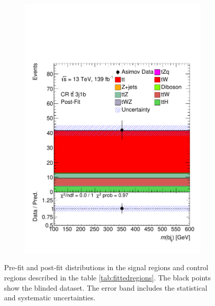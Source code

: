 \begin{figure}[!h]
\begin{subfigure}[b]{0.33\linewidth}
    \includegraphics[width=\textwidth]{ubonn-thesis/Chapters/Chapters_07/Figure/Asmiov/CR_3j1b_postFit.pdf}
   \caption{}
  \end{subfigure}%
  \caption{Pre-fit and post-fit distributions in the signal regions and control regions described in the table \ref{tab:fittedregions}. The black points show the blinded dataset. The error band includes the statistical and systematic uncertainties.}
  \label{fig:asimovfit2}
  \end{figure}

\newpage

\newpage

